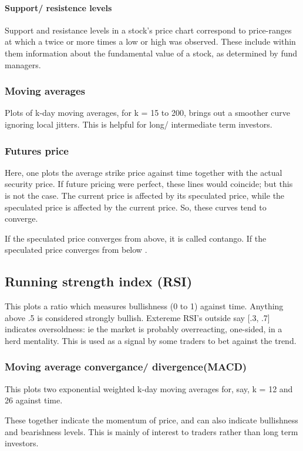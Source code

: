 \documentclass[oneside, article]{memoir}
\begin{document}
\paragraph{Support/ resistence levels}
Support and resistance levels in a stock's price chart correspond to price-ranges at which a twice or more times a low or high was observed. These include within them information about the fundamental value of a stock, as determined by fund managers.

\subsubsection{Moving averages}
Plots of k-day moving averages, for k = 15 to 200, brings out a smoother curve ignoring local jitters. This is helpful for long/ intermediate term investors.

\subsubsection{Futures price}
Here, one plots the average strike price against time together with the actual security price. If future pricing were perfect, these lines would coincide; but this is not the case. The current price is affected by its speculated price, while the speculated price is affected by the current price. So, these curves tend to converge.

If the speculated price converges from above, it is called contango. If the speculated price converges from below \tbc.

\subsection{Running strength index (RSI)}
This plots a ratio which measures bullishness (0 to 1) against time. Anything above .5 is considered strongly bullish. Extereme RSI's outside say [.3, .7] indicates oversoldness: ie the market is probably overreacting, one-sided, in a herd mentality. This is used as a signal by some traders to bet against the trend. 

\subsubsection{Moving average convergance/  divergence(MACD)}
This plots two exponential weighted k-day moving averages for, say, k = 12 and 26 against time. 

These together indicate the momentum of price, and can also indicate bullishness and bearishness levels. This is mainly of interest to traders rather than long term investors.
\end{document}
